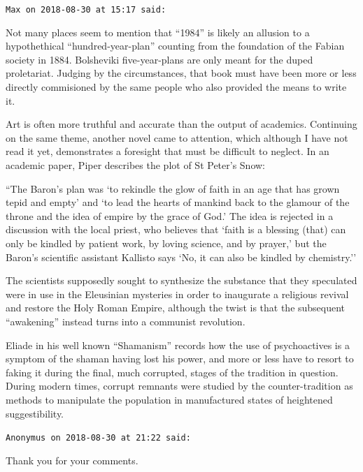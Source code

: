 \begin{footnotesize}
\begin{sffamily}
\hfill

\texttt{Max on 2018-08-30 at 15:17 said:}

Not many places seem to mention that ``1984'' is likely an allusion to a hypothethical ``hundred-year-plan'' counting from the foundation of the Fabian society in 1884. Bolsheviki five-year-plans are only meant for the duped proletariat. Judging by the circumstances, that book must have been more or less directly commisioned by the same people who also provided the means to write it.

Art is often more truthful and accurate than the output of academics. Continuing on the same theme, another novel came to attention, which although I have not read it yet, demonstrates a foresight that must be difficult to neglect. In an academic paper, Piper describes the plot of St Peter's Snow:

``The Baron's plan was `to rekindle the glow of faith in an age that has grown tepid and empty' and `to lead the hearts of mankind back to the glamour of the throne and the idea of empire by the grace of God.' The idea is rejected in a discussion with the local priest, who believes that `faith is a blessing (that) can only be kindled by patient work, by loving science, and by prayer,' but the Baron's scientific assistant Kallisto says `No, it can also be kindled by chemistry.''

The scientists supposedly sought to synthesize the substance that they speculated were in use in the Eleusinian mysteries in order to inaugurate a religious revival and restore the Holy Roman Empire, although the twist is that the subsequent ``awakening'' instead turns into a communist revolution.

Eliade in his well known ``Shamanism'' records how the use of psychoactives is a symptom of the shaman having lost his power, and more or less have to resort to faking it during the final, much corrupted, stages of the tradition in question. During modern times, corrupt remnants were studied by the counter-tradition as methods to manipulate the population in manufactured states of heightened suggestibility.

\hfill

\texttt{Anonymus on 2018-08-30 at 21:22 said:}

Thank you for your comments.


\hfill

\end{sffamily}
\end{footnotesize}

